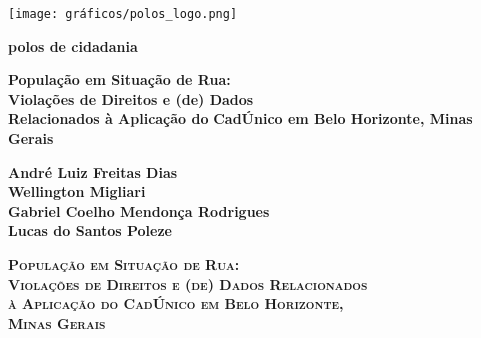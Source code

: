 \documentclass[12pt]{article}
\begin{document}
\thispagestyle{empty}
\begin{center}
{\texttt{[image: gráficos/polos\_logo.png]}}
\end{center}


\begin{minipage}{5.64cm}
\vspace{0.3cm}
{\textcolor{RedOrange}{\Large\textbf{polos de cidadania}}}
\end{minipage}

\begin{center}
\vspace{5.3cm}
{\textcolor{RedOrange}{\Huge\textbf{População em Situação de Rua:}}}\\
\vspace{0.1cm}
{\textcolor{RedOrange}{\LARGE\textbf{Violações de Direitos e (de) Dados}}}\\
\vspace{0.1cm}
{\textcolor{RedOrange}{\LARGE\textbf{Relacionados à Aplicação do}}}
\vspace{0.1cm}
{\textcolor{RedOrange}{\LARGE\textbf{CadÚnico em Belo Horizonte, Minas Gerais}}}
\end{center}

\vspace{3cm}

\hfill%
\begin{minipage}[t]{12cm}
\begin{flushright}
{\textcolor{RedOrange}{\large\textbf{André Luiz Freitas Dias}}}\\
\vspace{0.2cm}
{\textcolor{RedOrange}{\large\textbf{Wellington Migliari}}}\\
\vspace{0.2cm}
{\textcolor{RedOrange}{\large\textbf{Gabriel Coelho Mendonça Rodrigues}}}\\
\vspace{0.2cm}
{\textcolor{RedOrange}{\large\textbf{Lucas do Santos Poleze}}}
\end{flushright}
\end{minipage}
\newpage

\thispagestyle{empty}

\begin{center}
\vspace{2cm}
{\Huge\textsc\textbf{População em Situação de Rua:}}\\
\vspace{0.5cm}
{\Large\textsc\textbf{Violações de Direitos e (de) Dados Relacionados}}\\
\vspace{0.1cm}
{\Large\textsc\textbf{à Aplicação do CadÚnico em Belo Horizonte,}}\\
\vspace{0.1cm}
{\Large\textsc\textbf{Minas Gerais}}\\
\end{center}
\end{document}
